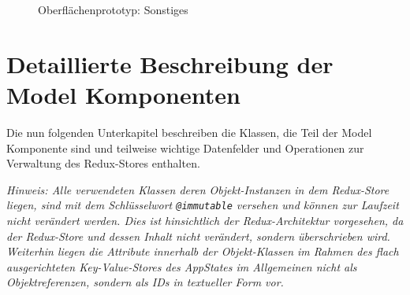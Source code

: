 \documentclass[bibliography=totoc,listof=totoc,BCOR=5mm,DIV=12,oneside]{scrbook}
\begin{document}
{\begin{figure}[H]
\centering
\caption{Oberflächenprototyp: Sonstiges}
\end{figure}



\newpage
\section{Detaillierte Beschreibung der Model Komponenten}
\label{anhang:komponentenDetails}
\par \bigskip Die nun folgenden Unterkapitel beschreiben die Klassen, die Teil der Model Komponente sind und teilweise wichtige Datenfelder und Operationen zur Verwaltung des Redux-Stores enthalten.

\par \bigskip \textit{Hinweis: Alle verwendeten Klassen deren Objekt-Instanzen in dem Redux-Store liegen, sind mit dem Schlüsselwort \texttt{@immutable} versehen und können zur Laufzeit nicht verändert werden. Dies ist hinsichtlich der Redux-Architektur vorgesehen, da der Redux-Store und dessen Inhalt nicht verändert, sondern überschrieben wird. Weiterhin liegen die Attribute innerhalb der Objekt-Klassen im Rahmen des flach ausgerichteten Key-Value-Stores des AppStates im Allgemeinen nicht als Objektreferenzen, sondern als IDs in textueller Form vor.}

}
\end{document}
